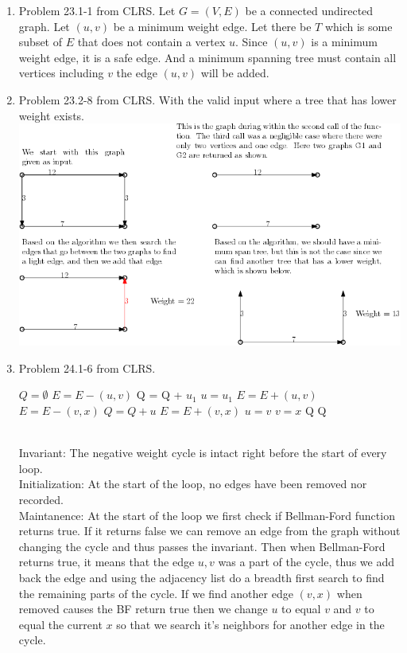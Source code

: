 \documentclass[letterpaper,11pt]{article}
\begin{document}
\begin{enumerate}
\item Problem 23.1-1 from CLRS.
Let $G = (V,E)$ be a connected undirected graph. Let $(u,v)$ be a minimum weight edge. Let there be $T$ which is some subset of $E$ that does not contain a vertex $u$. Since $(u,v)$ is a minimum weight edge, it is a safe edge. And a minimum spanning tree must contain all vertices including $v$ the edge $(u,v)$ will be added.
\item Problem 23.2-8 from CLRS.
With the valid input where a tree that has lower weight exists.
  \includegraphics{figure1}
\item Problem 24.1-6 from CLRS.
\begin{algorithm}
\begin{algorithmic}[1]
\State $Q = \emptyset$
\State $E = E - (u,v)$
\State Q = Q + $u_1$
\State $u = u_1$
\State $E = E + (u,v)$
\State $E = E - (v,x)$
\State $Q = Q + u$
\State $E = E + (v,x)$
\State $u = v$
\State $v = x$
\State \Return Q
\EndIf
\EndIf
\EndFor
\EndIf
\EndFor
\State \Return Q
\EndFunction
\end{algorithmic}
\end{algorithm}
\\Invariant: The negative weight cycle is intact right before the start of every loop.
\\Initialization: At the start of the loop, no edges have been removed nor recorded.
\\Maintanence: At the start of the loop we first check if Bellman-Ford function returns true. If it returns false we can remove an edge from the graph without changing the cycle and thus passes the invariant. Then when Bellman-Ford returns true, it means that the edge $u,v$ was a part of the cycle, thus we add back the edge and using the adjacency list do a breadth first search to find the remaining parts of the cycle. If we find another edge $(v,x)$ when removed causes the BF return true then we change $u$ to equal $v$ and $v$ to equal the current $x$ so that we search it's neighbors for another edge in the cycle.

\end{enumerate}
\end{document}
